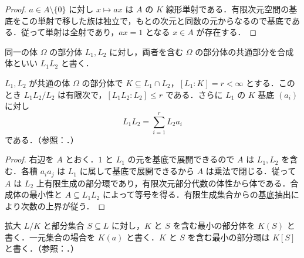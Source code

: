 \begin{proof}
$a\in A\setminus\{0\}$ に対し $x\mapsto ax$ は $A$ の $K$ 線形単射である．有限次元空間の基底をこの単射で移した族は独立で，もとの次元と同数の元からなるので基底である．従って単射は全射であり，$ax=1$ となる $x\in A$ が存在する．
\end{proof}
\begin{defn}[合成体]
同一の体 $\Omega$ の部分体 $L_1,L_2$ に対し，両者を含む $\Omega$ の部分体の共通部分を合成体といい $L_1L_2$ と書く．
\end{defn}
\begin{prop}[有限次拡大との合成体]
$L_1,L_2$ が共通の体 $\Omega$ の部分体で $K\subseteq L_1\cap L_2$，$[L_1:K]=r<\infty$ とする．このとき $L_1L_2/L_2$ は有限次で，$[L_1L_2:L_2]\leq r$ である．さらに $L_1$ の $K$ 基底 $(a_i)$ に対し
\[
L_1L_2=\sum_{i=1}^r L_2a_i
\]
である．（参照：．）
\end{prop}
\begin{proof}
右辺を $A$ とおく．$1$ と $L_1$ の元を基底で展開できるので $A$ は $L_1,L_2$ を含む．各積 $a_i a_j$ は $L_1$ に属して基底で展開できるから $A$ は乗法で閉じる．従って $A$ は $L_2$ 上有限生成の部分環であり，有限次元部分代数の体性から体である．合成体の最小性と $A\subseteq L_1L_2$ によって等号を得る．有限生成集合からの基底抽出により次数の上界が従う．
\end{proof}
\begin{defn}[生成される部分体]
拡大 $L/K$ と部分集合 $S\subseteq L$ に対し，$K$ と $S$ を含む最小の部分体を $K(S)$ と書く．一元集合の場合を $K(a)$ と書く．$K$ と $S$ を含む最小の部分環は $K[S]$ と書く．（参照：．）
\end{defn}
